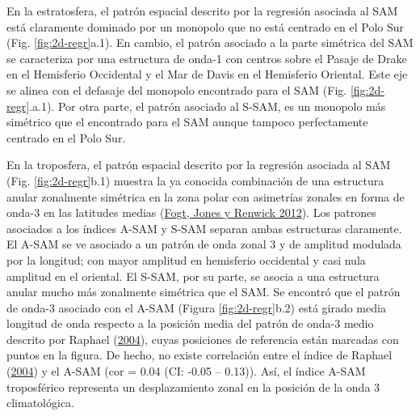 \documentclass[12pt,oneside,a4paper]{reedthesis}
\begin{document}
En la estratosfera, el patrón espacial descrito por la regresión asociada al SAM está claramente dominado por un monopolo que no está centrado en el Polo Sur (Fig. \ref{fig:2d-regr}a.1).
En cambio, el patrón asociado a la parte simétrica del SAM se caracteriza por una estructura de onda-1 con centros sobre el Pasaje de Drake en el Hemisferio Occidental y el Mar de Davis en el Hemisferio Oriental.
Este eje se alinea con el defasaje del monopolo encontrado para el SAM (Fig. \ref{fig:2d-regr}.a.1).
Por otra parte, el patrón asociado al S-SAM, es un monopolo más simétrico que el encontrado para el SAM aunque tampoco perfectamente centrado en el Polo Sur.

En la troposfera, el patrón espacial descrito por la regresión asociada al SAM (Fig. \ref{fig:2d-regr}b.1) muestra la ya conocida combinación de una estructura anular zonalmente simétrica en la zona polar con asimetrías zonales en forma de onda-3 en las latitudes medias (\protect\hyperlink{ref-fogt2012}{Fogt, Jones y Renwick 2012}).
Los patrones asociados a los índices A-SAM y S-SAM separan ambas estructuras claramente.
El A-SAM se ve asociado a un patrón de onda zonal 3 y de amplitud modulada por la longitud; con mayor amplitud en hemisferio occidental y casi nula amplitud en el oriental.
El S-SAM, por su parte, se asocia a una estructura anular mucho más zonalmente simétrica que el SAM.
Se encontró que el patrón de onda-3 asociado con el A-SAM (Figura \ref{fig:2d-regr}b.2) está girado media longitud de onda respecto a la posición media del patrón de onda-3 medio descrito por Raphael (\protect\hyperlink{ref-raphael2004}{2004}), cuyas posiciones de referencia están marcadas con puntos en la figura.
De hecho, no existe correlación entre el índice de Raphael (\protect\hyperlink{ref-raphael2004}{2004}) y el A-SAM (cor = 0.04 (CI: -0.05 -- 0.13)).
Así, el índice A-SAM troposférico representa un desplazamiento zonal en la posición de la onda 3 climatológica.
\end{document}
